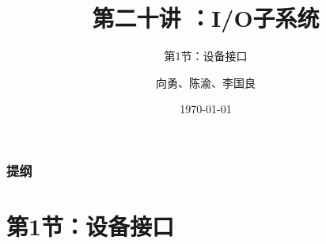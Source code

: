 


\title[第20讲]{第二十讲 ：I/O子系统} %
\subtitle{第1节：设备接口}
\author{向勇、陈渝、李国良} %
\date{\today} %



\begin{frame}
\titlepage %
\end{frame}

\begin{frame}
\frametitle{提纲} %
\tableofcontents %


\end{frame}
\section{第1节：设备接口} %
